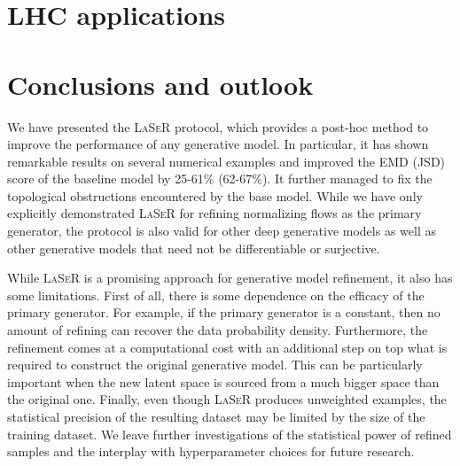 \section{LHC applications}
\label{sec:LHCexamples}

\section{Conclusions and outlook}
\label{sec:conclusion}

We have presented the \textsc{LaSeR} protocol, which provides a post-hoc method to improve the performance of any generative model. In particular, it has shown remarkable results on several numerical examples and improved the EMD (JSD) score of the baseline model by 25-61\% (62-67\%). It further managed to fix the topological obstructions encountered by the base model.  While we have only explicitly demonstrated \textsc{LaSeR} for refining normalizing flows as the primary generator, the protocol is also valid for other deep generative models as well as other generative models that need not be differentiable or surjective.

While \textsc{LaSeR} is a promising approach for generative model refinement, it also has some limitations.  First of all, there is some dependence on the efficacy of the primary generator. For example, if the primary generator is a constant, then no amount of refining can recover the data probability density.  Furthermore, the refinement comes at a computational cost with an additional step on top what is required to construct the original generative model.  This can be particularly important when the new latent space is sourced from a much bigger space than the original one.  Finally, even though \textsc{LaSeR} produces unweighted examples, the statistical precision of the resulting dataset may be limited by the size of the training dataset.  We leave further investigations of the statistical power of refined samples and the interplay with hyperparameter choices for future research.


%
